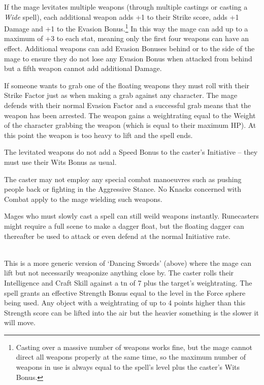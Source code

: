 \begin{multicols}{2}
If the mage levitates multiple weapons (through multiple castings or casting a \textit{Wide} spell), each additional weapon adds +1 to their Strike score, adds +1 Damage and +1 to the Evasion Bonus.\footnote{Casting over a massive number of weapons works fine, but the mage cannot direct all weapons properly at the same time, so the maximum number of weapons in use is always equal to the spell's level plus the caster's Wits Bonus.}
In this way the mage can add up to a maximum of +3 to each stat, meaning only the first four weapons can have an effect.
Additional weapons can add Evasion Bonuses behind or to the side of the mage to ensure they do not lose any Evasion Bonus when attacked from behind but a fifth weapon cannot add additional Damage.

If someone wants to grab one of the floating weapons they must roll with their Strike Factor just as when making a grab against any character.
The mage defends with their normal Evasion Factor and a successful grab means that the weapon has been arrested.
The weapon gains a \gls{weightrating} equal to the Weight of the character grabbing the weapon (which is equal to their maximum HP).
At this point the weapon is too heavy to lift and the spell ends.

The levitated weapons do not add a Speed Bonus to the caster's Initiative -- they must use their Wits Bonus as usual.

The caster may not employ any special combat manoeuvres such as pushing people back or fighting in the Aggressive Stance. No Knacks concerned with Combat apply to the mage wielding such weapons.

Mages who must slowly cast a spell can still weild weapons instantly.  Runecasters might require a full scene to make a dagger float, but the floating dagger can thereafter be used to attack or even defend at the normal Initiative rate.

\\
This is a more generic version of `Dancing Swords' (above) where the mage can lift but not necessarily weaponize anything close by.
The caster rolls their Intelligence and Craft Skill against a \gls{tn} of 7 plus the target's \gls{weightrating}.
The spell grants an effective Strength Bonus equal to the level in the Force sphere being used.
Any object with a \gls{weightrating} of up to 4 points higher than this Strength score can be lifted into the air but the heavier something is the slower it will move.


\end{multicols}
